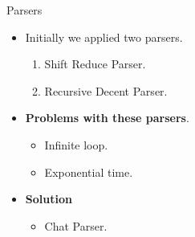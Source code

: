 \documentclass{beamer}
\begin{document}
\begin{frame}{Parsers}
\begin{itemize}
	\item Initially we applied two parsers. \\
	\vspace{0.5em}
	\begin{enumerate}
	\item Shift Reduce Parser.
	\item Recursive Decent Parser.
	\end{enumerate}
	\vspace{1em}
	\item  \textbf{Problems with these parsers}. \\
	\vspace{0.5em}
	\begin{itemize}
	\item Infinite loop.
	\item Exponential time.
	\end{itemize}
	\vspace{1em}
	\item \textbf{Solution}
	\vspace{0.5em}
	\begin{itemize}
	\item Chat Parser.
	\end{itemize}	
	\vspace{1em} 
\end{itemize}
\end{frame}
\end{document}
